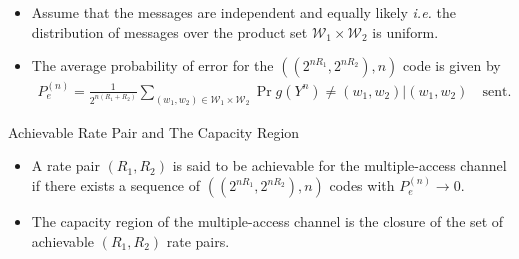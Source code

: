 \documentclass{beamer}
\newcommand{\red}[1]{{\color{red} #1}}
\begin{document}
{\begin{frame}
\begin{itemize}
\item<2-> Assume that the messages are independent and equally likely \textit{i.e.} the distribution of messages over the product set $\mathcal{W}_1 \times \mathcal{W}_2$ is uniform.

\item<3-> \red{The average probability of error} for the $((2^{nR_1},2^{nR_2}),n)$ code is given by
%
\begin{eqnarray*}
    P_e^{(n)} = \frac{1}{2^{n(R_1+R_2)}} \sum_{(w_1,w_2)\in \mathcal{W}_1 \times \mathcal{W}_2}\Pr {g(Y^n) \neq (w_1, w_2)|(w_1, w_2) \quad \text{sent}}.
\end{eqnarray*}
% 

 \end{itemize}
\end{frame}
\begin{frame}{Achievable Rate Pair and The Capacity Region} 
%
 \begin{itemize}
	\justifying

\item<1-> \red{A rate pair $(R_1, R_2)$} is said to be achievable for the multiple-access channel if there exists a sequence of $((2^{nR_1},2^{nR_2}),n)$ codes with $P_e^{(n)}\rightarrow 0$.

\item<2->  \red{The capacity region} of the multiple-access channel is the closure of the set of achievable $(R_1, R_2)$ rate pairs.


\end{itemize}
\end{frame}}
\end{document}
